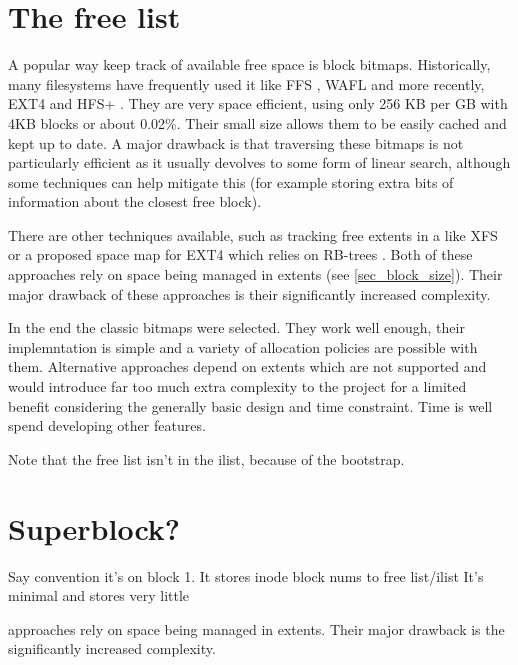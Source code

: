     \section{The free list}
        \label{sec_free_list}

        A popular way keep track of available free space is block bitmaps.
        Historically, many filesystems have frequently used it like FFS
        \cite{FFS}, WAFL \cite{WAFL} and more recently, EXT4
        \cite{ext4_space_maps} and HFS+ \cite{HFSplus}.  They are very space
        efficient, using only 256 KB per GB with 4KB blocks or about 0.02\%.
        Their small size allows them to be easily cached and kept up to date. A
        major drawback is that traversing these bitmaps is not particularly
        efficient as it usually devolves to some form of linear search,
        although some techniques can help mitigate this (for example storing
        extra bits of information about the closest free block).

        There are other techniques available, such as tracking free extents in
        a \bplustree like XFS \cite{XFS_scalability} or a proposed space map
        for EXT4 which relies on RB-trees \cite{ext4_space_maps}. Both of these
        approaches rely on space being managed in extents (see
        \ref{sec_block_size}).  Their major drawback of these approaches is
        their significantly increased complexity.

        In the end the classic bitmaps were selected. They work well enough,
        their implemntation is simple and a variety of allocation policies are
        possible with them. Alternative approaches depend on extents which are
        not supported and would introduce far too much extra complexity to the
        project for a limited benefit considering the generally basic design
        and time constraint. Time is well spend developing other features.

        Note that the free list isn't in the ilist, because of the bootstrap.

    \section{Superblock?}

        Say convention it's on block 1. It stores inode block nums to free list/ilist
        It's minimal and stores very little

        approaches rely on space being managed in extents. Their major drawback is
        the significantly increased complexity.

